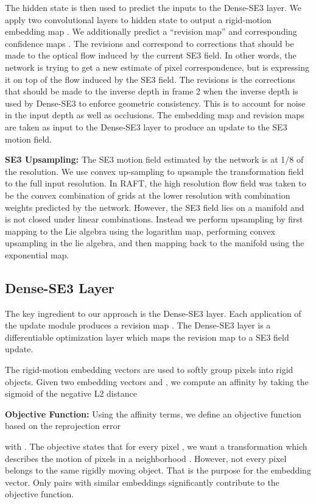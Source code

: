 \documentclass[final]{cvpr}
\begin{document}
The hidden state is then used to predict the inputs to the Dense-SE3 layer. We apply two convolutional layers to hidden state to output a rigid-motion embedding map . We additionally predict a ``revision map''  and corresponding confidence maps . The revisions  and  correspond to corrections that should be   made to the optical flow induced by the current SE3 field. In other words, the network is trying to get a new estimate of pixel correspondence, but is expressing it on top of the flow induced by the SE3 field. 
The revisions  is the corrections that should be made to the inverse depth in frame 2 when the inverse depth is used by Dense-SE3 to enforce geometric consistency. This is to account for noise in the input depth as well as occlusions. The embedding map and revision maps are taken as input to the Dense-SE3 layer to produce an update to the SE3 motion field. 


\vspace{1mm} \noindent \textbf{SE3 Upsampling:} The SE3 motion field estimated by the network is at 1/8 of the resolution. We use convex up-sampling \cite{teed2020raft} to upsample the transformation field to the full input resolution. In RAFT\cite{teed2020raft}, the high resolution flow field was taken to be the convex combination of  grids at the lower resolution with combination weights predicted by the network. However, the SE3 field  lies on a manifold and is not closed under linear combinations. Instead we perform upsampling by first mapping  to the Lie algebra using the logarithm map, performing convex upsampling in the lie algebra, and then mapping back to the manifold using the exponential map.

\subsection{Dense-SE3 Layer}
The key ingredient to our approach is the Dense-SE3 layer. Each application of the update module produces a revision map . The Dense-SE3 layer is a differentiable optimization layer which maps the revision map to a SE3 field update.

The rigid-motion embedding vectors are used to softly group pixels into rigid objects. Given two embedding vectors  and , we compute an affinity  by taking the sigmoid of the negative L2 distance


\noindent \textbf{Objective Function:} Using the affinity terms, we define an objective function based on the reprojection error

with . The objective states that for every pixel , we want a transformation  which describes the motion of pixels in a neighborhood . However, not every pixel  belongs to the same rigidly moving object. That is the purpose for the embedding vector. Only pairs  with similar embeddings significantly contribute to the objective function. 
\end{document}
